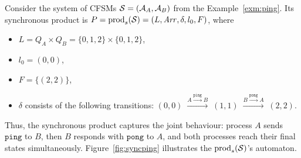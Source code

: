 \begin{example}\label{exm:syncping}
Consider the system of CFSMs $\mathcal{S} = (\mathcal{A}_A, \mathcal{A}_B)$ 
from the Example~\ref{exm:ping}. Its synchronous product is 
$P = \mathrm{prod}_s(\mathcal{S}) = (L, \mathit{Arr}, \delta, l_0, F)$,
where
\begin{itemize}
  \item $L = Q_A \times Q_B = \{0,1,2\} \times \{0,1,2\}$,
  \item $l_0 = (0,0)$,
  \item $F = \{(2,2)\}$,
  \item $\delta$ consists of the following transitions:
  $(0,0) \;\xrightarrow{A \xrightarrow{\texttt{ping}} B}\; (1,1)
  \;\xrightarrow{B \xrightarrow{\texttt{pong}} A}\; (2,2)$.
\end{itemize}
Thus, the synchronous product captures the joint behaviour: process $A$ 
sends $\texttt{ping}$ to $B$, then $B$ responds with $\texttt{pong}$ 
to $A$, and both processes reach their final states simultaneously.
Figure~\ref{fig:syncping} illustrates the $\mathrm{prod}_s(\mathcal{S})$'s automaton.


\end{example}
